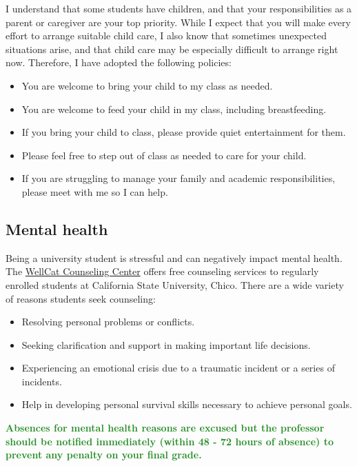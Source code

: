 \documentclass[11pt,]{article}
\providecommand{\tightlist}{%
  \setlength{\itemsep}{0pt}\setlength{\parskip}{0pt}}
\begin{document}
I understand that some students have children, and that your
responsibilities as a parent or caregiver are your top priority. While I
expect that you will make every effort to arrange suitable child care, I
also know that sometimes unexpected situations arise, and that child
care may be especially difficult to arrange right now. Therefore, I have
adopted the following policies:

\begin{itemize}
\item
  You are welcome to bring your child to my class as needed.
\item
  You are welcome to feed your child in my class, including
  breastfeeding.
\item
  If you bring your child to class, please provide quiet entertainment
  for them.
\item
  Please feel free to step out of class as needed to care for your
  child.
\item
  If you are struggling to manage your family and academic
  responsibilities, please meet with me so I can help.
\end{itemize}

\hypertarget{mental-health}{%
\subsection{Mental health}\label{mental-health}}

Being a university student is stressful and can negatively impact mental
health. The \href{https://www.csuchico.edu/counseling/}{WellCat
Counseling Center} offers free counseling services to regularly enrolled
students at California State University, Chico. There are a wide variety
of reasons students seek counseling:

\begin{itemize}
\tightlist
\item
  Resolving personal problems or conflicts.
\item
  Seeking clarification and support in making important life decisions.
\item
  Experiencing an emotional crisis due to a traumatic incident or a
  series of incidents.
\item
  Help in developing personal survival skills necessary to achieve
  personal goals.
\end{itemize}

\textcolor{ForestGreen}{\bf{Absences for mental health reasons are excused but the professor should be notified immediately (within 48 - 72 hours of absence) to prevent any penalty on your final grade.}}
\end{document}
